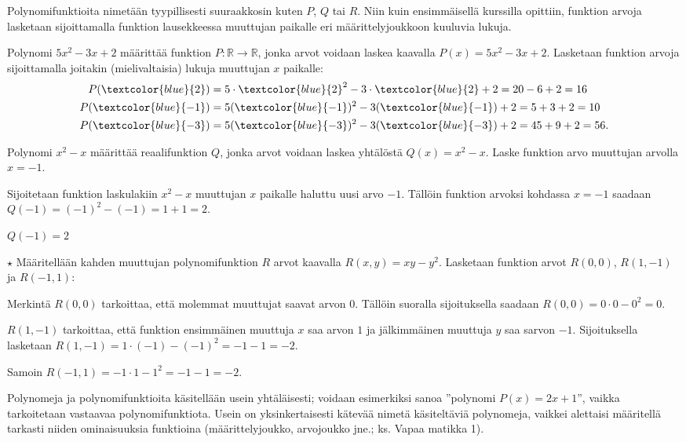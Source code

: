 Polynomifunktioita nimetään tyypillisesti suuraakkosin kuten $P$, $Q$ tai $R$. Niin kuin ensimmäisellä kurssilla opittiin, funktion arvoja lasketaan sijoittamalla funktion lausekkeessa muuttujan paikalle eri määrittelyjoukkoon kuuluvia lukuja.
\newpage
\begin{esimerkki}
Polynomi $5x^2-3x+2$ määrittää funktion $P:\mathbb{R}\rightarrow \mathbb{R}$, jonka arvot voidaan laskea kaavalla $P(x)=5x^2-3x+2$. Lasketaan funktion arvoja sijoittamalla joitakin (mielivaltaisia) lukuja muuttujan $x$ paikalle:
\begin{align*}
    P(\textcolor{blue}{2}) & = 5\cdot \textcolor{blue}{2}^2-3\cdot \textcolor{blue}{2}+2 = 20 - 6 + 2 = 16 \\
    P(\textcolor{blue}{-1}) & = 5(\textcolor{blue}{-1})^2-3(\textcolor{blue}{-1})+2 = 5 + 3 + 2 = 10 \\
    P(\textcolor{blue}{-3}) & = 5(\textcolor{blue}{-3})^2-3(\textcolor{blue}{-3})+2 = 45 + 9 + 2 = 56.
\end{align*}
\end{esimerkki}

\begin{esimerkki}
Polynomi $x^2-x$ määrittää reaalifunktion $Q$, jonka arvot voidaan laskea yhtälöstä $Q(x)=x^2-x$. Laske funktion arvo muuttujan arvolla $x=-1$. 
		\begin{esimratk}
			Sijoitetaan funktion laskulakiin $x^2-x$ muuttujan $x$ paikalle haluttu uusi arvo $-1$. Tällöin funktion arvoksi kohdassa $x=-1$ saadaan $Q(-1)=(-1)^2-(-1)=1+1=2$.
		\end{esimratk}
		\begin{esimvast}
		$Q(-1)=2$
		\end{esimvast}
\end{esimerkki}

\begin{esimerkki} $\star$ Määritellään kahden muuttujan polynomifunktion $R$ arvot kaavalla $R(x,y)=xy-y^2$. Lasketaan funktion arvot $R(0,0)$, $R(1,-1)$ ja $R(-1,1)$:

Merkintä $R(0,0)$ tarkoittaa, että molemmat muuttujat saavat arvon $0$. Tällöin suoralla sijoituksella saadaan $R(0,0)=0\cdot 0-0^2=0$.

$R(1,-1)$ tarkoittaa, että funktion ensimmäinen muuttuja $x$ saa arvon $1$ ja jälkimmäinen muuttuja $y$ saa sarvon $-1$. Sijoituksella lasketaan $R(1,-1)=1\cdot (-1)-(-1)^2=-1-1=-2$.

Samoin $R(-1,1)=-1\cdot1-1^2=-1-1=-2$.

\end{esimerkki}

Polynomeja ja polynomifunktioita käsitellään usein yhtäläisesti; voidaan esimerkiksi sanoa ''polynomi $P(x)=2x+1$'', vaikka tarkoitetaan vastaavaa polynomifunktiota. Usein on yksinkertaisesti kätevää nimetä käsiteltäviä polynomeja, vaikkei alettaisi määritellä tarkasti niiden ominaisuuksia funktioina (määrittelyjoukko, arvojoukko jne.; ks. Vapaa matikka 1). %